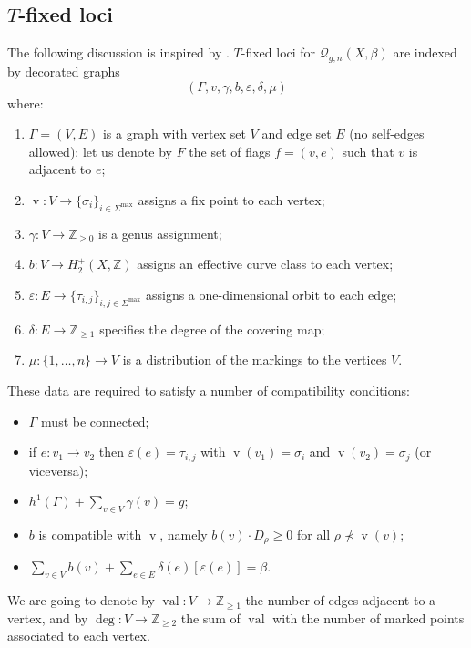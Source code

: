 \documentclass[11pt]{amsart}
\newcommand{\Q}[4]{\mathcal{Q}_{#1,#2}(#3,#4)}
\renewcommand{\to}{\rightarrow}
\newcommand{\val}{\operatorname{val}}
\newcommand{\ZZ}{\mathbb{Z}}
\newcommand{\vv}{\operatorname{v}}
\theoremstyle{definition}
\theoremstyle{definition}
\begin{document}
\subsection{$T$-fixed loci}
The following discussion is inspired by \cite[\S 7.3]{MOP}. $T$-fixed loci for $\Q{g}{n}{X}{\beta}$ are indexed by decorated graphs
\[ \left(\Gamma, v, \gamma, b,\varepsilon,\delta,\mu\right) \]
where:
\begin{enumerate}
 \item $\Gamma=(V,E)$ is a graph with vertex set $V$ and edge set $E$ (no self-edges allowed); let us denote by $F$ the set of flags $f=(v,e)$ such that $v$ is adjacent to $e$;
 \item $\vv\colon V\to \{\sigma_i\}_{i\in\Sigma^\text{max}}$ assigns a fix point to each vertex;
 \item $\gamma\colon V\to \ZZ_{\geq 0}$ is a genus assignment;
 \item $b\colon V\to H^+_2(X,\ZZ)$ assigns an effective curve class to each vertex;
 \item $\varepsilon\colon E\to \{\tau_{i,j}\}_{i,j\in\Sigma^\text{max}}$ assigns a one-dimensional orbit to each edge;
 \item $\delta\colon E\to \ZZ_{\geq1}$ specifies the degree of the covering map;
 \item $\mu\colon \{1,\ldots,n\}\to V$ is a distribution of the markings to the vertices $V$.
\end{enumerate}
These data are required to satisfy a number of compatibility conditions:
\begin{itemize}
 \item $\Gamma$ must be connected;
 \item if $e\colon v_1\to v_2$ then $\varepsilon(e)=\tau_{i,j}$ with $\vv(v_1)=\sigma_i$ and $\vv(v_2)=\sigma_j$ (or viceversa);
 \item $h^1(\Gamma)+\sum_{v\in V} \gamma(v)=g$;
 \item $b$ is compatible with $\vv$, namely $b(v)\cdot D_\rho\geq 0$ for all $\rho\nprec \vv(v)$; 
 \item $\sum_{v\in V}b(v)+\sum_{e\in E}\delta(e)[\varepsilon(e)]=\beta$.
 \end{itemize}
We are going to denote by $\val\colon V\to\ZZ_{\geq1}$ the number of edges adjacent to a vertex, and by $\deg\colon V\to\ZZ_{\geq2}$ the sum of $\val$ with the number of marked points associated to each vertex.
\end{document}
